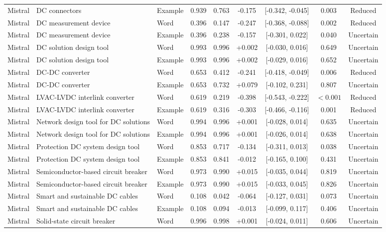 \begin{landscape}
\begin{longtable}{lllcccccc}
Mistral & DC connectors & Example & 0.939 & 0.763 & -0.175 & [-0.342, -0.045] & 0.003 & Reduced \\
Mistral & DC measurement device & Word & 0.396 & 0.147 & -0.247 & [-0.368, -0.088] & 0.002 & Reduced \\
Mistral & DC measurement device & Example & 0.396 & 0.238 & -0.157 & [-0.301, 0.022] & 0.040 & Uncertain \\
Mistral & DC solution design tool & Word & 0.993 & 0.996 & +0.002 & [-0.030, 0.016] & 0.649 & Uncertain \\
Mistral & DC solution design tool & Example & 0.993 & 0.996 & +0.002 & [-0.029, 0.016] & 0.652 & Uncertain \\
Mistral & DC-DC converter & Word & 0.653 & 0.412 & -0.241 & [-0.418, -0.049] & 0.006 & Reduced \\
Mistral & DC-DC converter & Example & 0.653 & 0.732 & +0.079 & [-0.102, 0.231] & 0.807 & Uncertain \\
Mistral & LVAC-LVDC interlink converter & Word & 0.619 & 0.219 & -0.398 & [-0.543, -0.222] & $<0.001$ & Reduced \\
Mistral & LVAC-LVDC interlink converter & Example & 0.619 & 0.316 & -0.303 & [-0.466, -0.116] & 0.001 & Reduced \\
Mistral & Network design tool for DC solutions & Word & 0.994 & 0.996 & +0.001 & [-0.028, 0.014] & 0.635 & Uncertain \\
Mistral & Network design tool for DC solutions & Example & 0.994 & 0.996 & +0.001 & [-0.026, 0.014] & 0.638 & Uncertain \\
Mistral & Protection DC system design tool & Word & 0.853 & 0.717 & -0.134 & [-0.311, 0.013] & 0.038 & Uncertain \\
Mistral & Protection DC system design tool & Example & 0.853 & 0.841 & -0.012 & [-0.165, 0.100] & 0.431 & Uncertain \\
Mistral & Semiconductor-based circuit breaker & Word & 0.973 & 0.990 & +0.015 & [-0.035, 0.044] & 0.819 & Uncertain \\
Mistral & Semiconductor-based circuit breaker & Example & 0.973 & 0.990 & +0.015 & [-0.033, 0.045] & 0.826 & Uncertain \\
Mistral & Smart and sustainable DC cables & Word & 0.108 & 0.042 & -0.064 & [-0.127, 0.031] & 0.073 & Uncertain \\
Mistral & Smart and sustainable DC cables & Example & 0.108 & 0.094 & -0.013 & [-0.099, 0.117] & 0.406 & Uncertain \\
Mistral & Solid-state circuit breaker & Word & 0.996 & 0.998 & +0.001 & [-0.024, 0.011] & 0.606 & Uncertain \\

\end{longtable}
\end{landscape}
